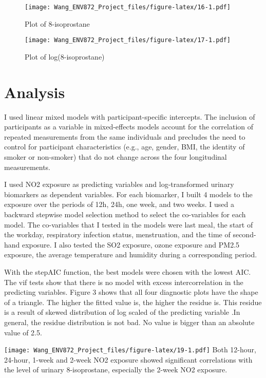 \documentclass[12pt,]{article}
\begin{document}
\begin{figure}
\centering
\texttt{[image: Wang\_ENV872\_Project\_files/figure-latex/16-1.pdf]}
\caption{Plot of 8-isoprostane}
\end{figure}

\begin{figure}
\centering
\texttt{[image: Wang\_ENV872\_Project\_files/figure-latex/17-1.pdf]}
\caption{Plot of log(8-isoprostane)}
\end{figure}

\hypertarget{analysis}{%
\section{Analysis}\label{analysis}}

I used linear mixed models with participant-specific intercepts. The
inclusion of participants as a variable in mixed-effects models account
for the correlation of repeated measurements from the same individuals
and precludes the need to control for participant characteristics (e.g.,
age, gender, BMI, the identity of smoker or non-smoker) that do not
change across the four longitudinal measurements.

I used NO2 exposure as predicting variables and log-transformed urinary
biomarkers as dependent variables. For each biomarker, I built 4 models
to the exposure over the periods of 12h, 24h, one week, and two weeks. I
used a backward stepwise model selection method to select the
co-variables for each model. The co-variables that I tested in the
models were last meal, the start of the workday, respiratory infection
status, menstruation, and the time of second-hand exposure. I also
tested the SO2 exposure, ozone exposure and PM2.5 exposure, the average
temperature and humidity during a corresponding period.

With the stepAIC function, the best models were chosen with the lowest
AIC. The vif tests show that there is no model with excess
intercorrelation in the predicting variables. Figure 3 shows that all
four diagnostic plots have the shape of a triangle. The higher the
fitted value is, the higher the residue is. This residue is a result of
skewed distribution of log scaled of the predicting variable .In
general, the residue distribution is not bad. No value is bigger than an
absolute value of 2.5.

\texttt{[image: Wang\_ENV872\_Project\_files/figure-latex/19-1.pdf]} Both
12-hour, 24-hour, 1-week and 2-week NO2 exposure showed significant
correlations with the level of urinary 8-isoprostane, especially the
2-week NO2 exposure.
\end{document}
